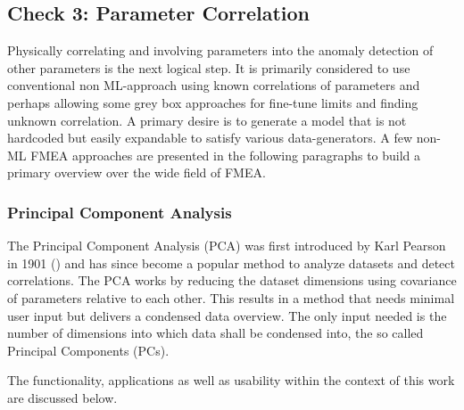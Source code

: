 \subsection{Check 3: Parameter Correlation}
Physically correlating and involving parameters into the anomaly detection of other parameters is the next logical step. It is primarily considered to use conventional non ML-approach using known correlations of parameters and perhaps allowing some grey box approaches for fine-tune limits and finding unknown correlation. A primary desire is to generate a model that is not hardcoded but easily expandable to satisfy various data-generators. A few non-ML FMEA approaches are presented in the following paragraphs to build a primary overview over the wide field of FMEA.

\subsubsection{Principal Component Analysis}

The Principal Component Analysis (PCA) was first introduced by Karl Pearson in 1901 (\cite{pearson_liii_1901}) and has since become a popular method to analyze datasets and detect correlations. The PCA works by reducing the dataset dimensions using covariance of parameters relative to each other. This results in a method that needs minimal user input but delivers a condensed data overview. The only input needed is the number of dimensions into which data shall be condensed into, the so called Principal Components (PCs).

The functionality, applications as well as usability within the context of this work are discussed below.

